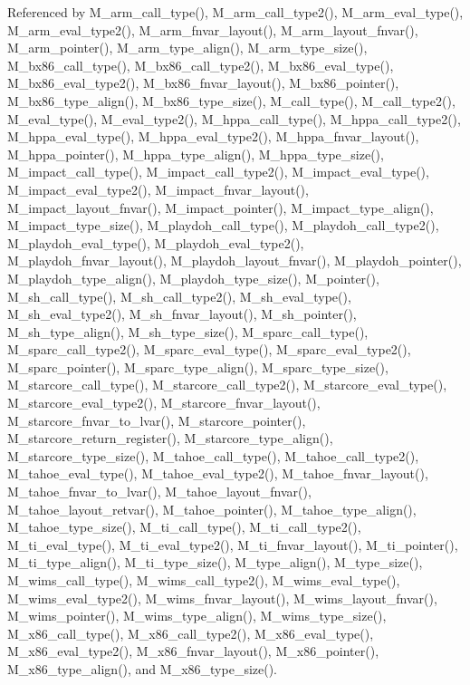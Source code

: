 Referenced by M\_\-arm\_\-call\_\-type(), M\_\-arm\_\-call\_\-type2(), M\_\-arm\_\-eval\_\-type(), M\_\-arm\_\-eval\_\-type2(), M\_\-arm\_\-fnvar\_\-layout(), M\_\-arm\_\-layout\_\-fnvar(), M\_\-arm\_\-pointer(), M\_\-arm\_\-type\_\-align(), M\_\-arm\_\-type\_\-size(), M\_\-bx86\_\-call\_\-type(), M\_\-bx86\_\-call\_\-type2(), M\_\-bx86\_\-eval\_\-type(), M\_\-bx86\_\-eval\_\-type2(), M\_\-bx86\_\-fnvar\_\-layout(), M\_\-bx86\_\-pointer(), M\_\-bx86\_\-type\_\-align(), M\_\-bx86\_\-type\_\-size(), M\_\-call\_\-type(), M\_\-call\_\-type2(), M\_\-eval\_\-type(), M\_\-eval\_\-type2(), M\_\-hppa\_\-call\_\-type(), M\_\-hppa\_\-call\_\-type2(), M\_\-hppa\_\-eval\_\-type(), M\_\-hppa\_\-eval\_\-type2(), M\_\-hppa\_\-fnvar\_\-layout(), M\_\-hppa\_\-pointer(), M\_\-hppa\_\-type\_\-align(), M\_\-hppa\_\-type\_\-size(), M\_\-impact\_\-call\_\-type(), M\_\-impact\_\-call\_\-type2(), M\_\-impact\_\-eval\_\-type(), M\_\-impact\_\-eval\_\-type2(), M\_\-impact\_\-fnvar\_\-layout(), M\_\-impact\_\-layout\_\-fnvar(), M\_\-impact\_\-pointer(), M\_\-impact\_\-type\_\-align(), M\_\-impact\_\-type\_\-size(), M\_\-playdoh\_\-call\_\-type(), M\_\-playdoh\_\-call\_\-type2(), M\_\-playdoh\_\-eval\_\-type(), M\_\-playdoh\_\-eval\_\-type2(), M\_\-playdoh\_\-fnvar\_\-layout(), M\_\-playdoh\_\-layout\_\-fnvar(), M\_\-playdoh\_\-pointer(), M\_\-playdoh\_\-type\_\-align(), M\_\-playdoh\_\-type\_\-size(), M\_\-pointer(), M\_\-sh\_\-call\_\-type(), M\_\-sh\_\-call\_\-type2(), M\_\-sh\_\-eval\_\-type(), M\_\-sh\_\-eval\_\-type2(), M\_\-sh\_\-fnvar\_\-layout(), M\_\-sh\_\-pointer(), M\_\-sh\_\-type\_\-align(), M\_\-sh\_\-type\_\-size(), M\_\-sparc\_\-call\_\-type(), M\_\-sparc\_\-call\_\-type2(), M\_\-sparc\_\-eval\_\-type(), M\_\-sparc\_\-eval\_\-type2(), M\_\-sparc\_\-pointer(), M\_\-sparc\_\-type\_\-align(), M\_\-sparc\_\-type\_\-size(), M\_\-starcore\_\-call\_\-type(), M\_\-starcore\_\-call\_\-type2(), M\_\-starcore\_\-eval\_\-type(), M\_\-starcore\_\-eval\_\-type2(), M\_\-starcore\_\-fnvar\_\-layout(), M\_\-starcore\_\-fnvar\_\-to\_\-lvar(), M\_\-starcore\_\-pointer(), M\_\-starcore\_\-return\_\-register(), M\_\-starcore\_\-type\_\-align(), M\_\-starcore\_\-type\_\-size(), M\_\-tahoe\_\-call\_\-type(), M\_\-tahoe\_\-call\_\-type2(), M\_\-tahoe\_\-eval\_\-type(), M\_\-tahoe\_\-eval\_\-type2(), M\_\-tahoe\_\-fnvar\_\-layout(), M\_\-tahoe\_\-fnvar\_\-to\_\-lvar(), M\_\-tahoe\_\-layout\_\-fnvar(), M\_\-tahoe\_\-layout\_\-retvar(), M\_\-tahoe\_\-pointer(), M\_\-tahoe\_\-type\_\-align(), M\_\-tahoe\_\-type\_\-size(), M\_\-ti\_\-call\_\-type(), M\_\-ti\_\-call\_\-type2(), M\_\-ti\_\-eval\_\-type(), M\_\-ti\_\-eval\_\-type2(), M\_\-ti\_\-fnvar\_\-layout(), M\_\-ti\_\-pointer(), M\_\-ti\_\-type\_\-align(), M\_\-ti\_\-type\_\-size(), M\_\-type\_\-align(), M\_\-type\_\-size(), M\_\-wims\_\-call\_\-type(), M\_\-wims\_\-call\_\-type2(), M\_\-wims\_\-eval\_\-type(), M\_\-wims\_\-eval\_\-type2(), M\_\-wims\_\-fnvar\_\-layout(), M\_\-wims\_\-layout\_\-fnvar(), M\_\-wims\_\-pointer(), M\_\-wims\_\-type\_\-align(), M\_\-wims\_\-type\_\-size(), M\_\-x86\_\-call\_\-type(), M\_\-x86\_\-call\_\-type2(), M\_\-x86\_\-eval\_\-type(), M\_\-x86\_\-eval\_\-type2(), M\_\-x86\_\-fnvar\_\-layout(), M\_\-x86\_\-pointer(), M\_\-x86\_\-type\_\-align(), and M\_\-x86\_\-type\_\-size().

